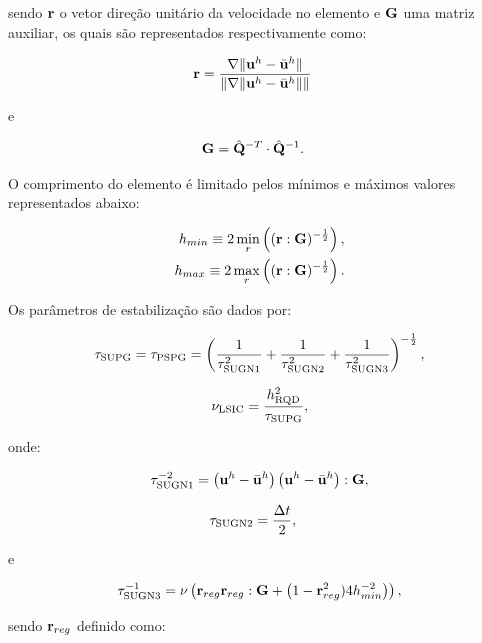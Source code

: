 \documentclass[tese_patricia]{subfiles}%
\begin{document}
\noindent sendo $\mathbf{r}$ o vetor direção unitário da velocidade no elemento e $\mathbf{G}$ uma matriz auxiliar, os quais são representados respectivamente como:

\begin{align}
\mathbf{r}&=\frac{\nabla \lVert\mathbf{u}^h - \bar{\mathbf{u}}^h\rVert}{\lVert \nabla \lVert\mathbf{u}^h - \bar{\mathbf{u}}^h\rVert\rVert} \label{eq:erRGN}
\end{align}

\noindent e

\begin{align}
\mathbf{G} &= \hat{\mathbf{Q}}^{-T} \cdot \hat{\mathbf{Q}}^{-1}. 
\end{align}

O comprimento do elemento é limitado pelos mínimos e máximos valores representados abaixo:

\begin{align}
h_{min} \equiv 2\min_{r}\left((\mathbf{r}:\mathbf{G})^{-\frac{1}{2}} \right), \\
h_{max} \equiv 2\max_{r}\left((\mathbf{r}:\mathbf{G})^{-\frac{1}{2}} \right).
\end{align}

Os parâmetros de estabilização são dados por:

\begin{align}
\tau_{\mathrm{SUPG}} = \tau_{\mathrm{PSPG}} =\left(\frac{1}{\tau_{\mathrm{SUGN1}}^2} + \frac{1}{\tau_{\mathrm{SUGN2}}^2} + \frac{1}{\tau_{\mathrm{SUGN3}}^2} \right)^{-\frac{1}{2}},
\end{align}

\begin{align}
\nu_{\mathrm{LSIC}} = \frac{h_{\mathrm{RQD}}^2}{\tau_{\mathrm{SUPG}}},
\end{align}

\noindent onde:

\begin{align}
\tau_{\mathrm{SUGN1}}^{-2} = \left(\mathbf{u}^h - \bar{\mathbf{u}}^h \right) \left(\mathbf{u}^h - \bar{\mathbf{u}}^h \right) : \mathbf{G} ,
\end{align}

\begin{align}
\tau_{\mathrm{SUGN2}}&=\frac{\Delta t}{2},
\end{align}

\noindent e

\begin{align}
\tau_{\mathrm{SUGN3}}^{-1} = \nu \left(\mathbf{r}_{reg}\mathbf{r}_{reg} : \mathbf{G} + \left(1 - \mathbf{r}_{reg}^2)4h_{min}^{-2} \right)\right) ,
\end{align}

\noindent sendo $\mathbf{r}_{reg}$ definido como:
\end{document}
